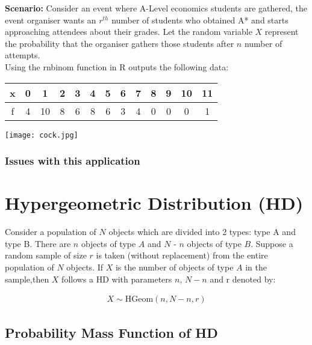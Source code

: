 \documentclass{article}
\begin{document}
\textbf{Scenario:} Consider an event
where A-Level economics students are gathered, the event organiser
wants an $ r^{th} $ number of students who obtained A* and starts 
approaching attendees about their grades. Let the random variable
$ X $ represent the probability that the organiser gathers
those students after $ n $ number of attempts. \\



Using the rnbinom function in R outputs the following data:

\begin{center}
  \begin{tabular}{|c|c|c|c|c|c|c|c|c|c|c|c|c|}
    \hline
    x & 0 & 1 & 2 & 3 & 4 & 5 & 6 & 7 & 8 & 9 & 10 & 11 \\
    \hline
    f & 4 & 10 & 8 & 6 & 8 & 6 & 3 & 4 & 0 & 0 & 0 & 1\\
    \hline
  \end{tabular}
\end{center}


\begin{center}
  \texttt{[image: cock.jpg]}
\end{center}

\subsubsection{Issues with this application}

\section{Hypergeometric Distribution (HD)}
Consider a population of $N$ objects which are divided into 2 types: type A and type B.
There are
$n$ objects of type $A$ and $N$ - $n$ objects of type $B$.
Suppose a random sample of size $r$ is taken
(without replacement) from the entire population of $N$ objects. If $X$ 
is the number of objects of
type $A$ in the sample,then $X$ follows a HD with parameters $n$, 
$N-n$ and r denoted by:

\begin{gather*}
  X \sim \text{HGeom}(n, N-n, r)
\end{gather*}

\subsection{Probability Mass Function of HD}
\end{document}

